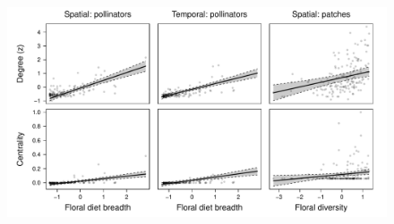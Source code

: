 \documentclass{article}\usepackage[]{graphicx}\usepackage[]{color}
\begin{document}
\begin{figure}[h!]
  \centering
  \includegraphics[width=1\textwidth]{figure/all_sig_drop_li_htTRUE.pdf}
  \label{fig:connectivity}
\end{figure}
\clearpage


\clearpage

\clearpage
\end{document}
